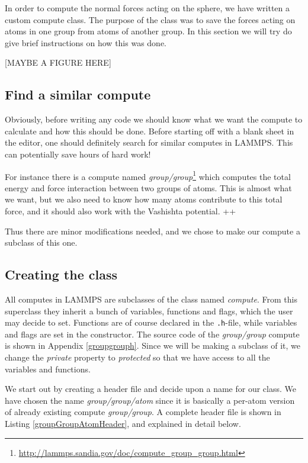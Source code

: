 \documentclass[twoside,english]{uiofysmaster}
\begin{document}
In order to compute the normal forces acting on the sphere, we have written a custom compute class. The purpose of the class was to save the forces acting on atoms in one group from atoms of another group. In this section we will try do give brief instructions on how this was done.

[MAYBE A FIGURE HERE]

\subsection{Find a similar compute}
Obviously, before writing any code we should know what we want the compute to calculate and how this should be done. 
Before starting off with a blank sheet in the editor, one should definitely search for similar computes in LAMMPS. This can potentially save hours of hard work!

For instance there is a compute named \textit{group/group}\footnote{\href{http://lammps.sandia.gov/doc/compute_group_group.html}{http://lammps.sandia.gov/doc/compute\_group\_group.html}} which computes the total energy and force interaction between two groups of atoms. This is almost what we want, but we also need to know how many atoms contribute to this total force, and it should also work with the Vashishta potential. {\color{red} ++}

Thus there are minor modifications needed, and we chose to make our compute a subclass of this one.


\subsection{Creating the class}
All computes in LAMMPS are subclasses of the class named  \textit{compute}. From this superclass they inherit a bunch of variables, functions and flags, which the user may decide to set. Functions are of course declared in the \texttt{.h}-file, while variables and flags are set in the constructor. The source code of the \textit{group/group} compute is shown in Appendix \ref{groupgrouph}. Since we will be making a subclass of it, we change the \textit{private} property to \textit{protected} so that we have access to all the variables and functions.

We start out by creating a header file and decide upon a name for our class. We have chosen the name \textit{group/group/atom} since it is basically a per-atom version of already existing compute \textit{group/group}. A complete header file is shown in Listing \ref{groupGroupAtomHeader}, and explained in detail below.
\end{document}
